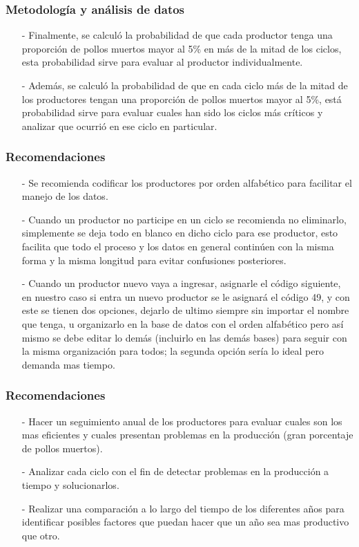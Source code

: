 \documentclass[11pt]{beamer}
\begin{document}
\begin{frame}
\frametitle{Metodología y análisis de datos}
\begin{itemize}
\item[-]Finalmente, se calculó la probabilidad de que cada productor tenga una proporción de pollos muertos mayor al 5\% en más de la mitad de los ciclos, esta probabilidad sirve para evaluar al productor individualmente.
\item[-]Además, se calculó la probabilidad de que en cada ciclo más de la mitad de los productores tengan una proporción de pollos muertos mayor al 5\%, está probabilidad sirve para evaluar cuales han sido los ciclos más críticos y analizar que ocurrió en ese ciclo en particular.
\end{itemize}
\end{frame}


\begin{frame}
\frametitle{Recomendaciones}
\begin{itemize}
\item[-]Se recomienda codificar los productores por orden alfabético para facilitar el manejo de los datos.
\item[-]Cuando un productor no participe en un ciclo se recomienda no eliminarlo, simplemente se deja todo en blanco en dicho ciclo para ese productor, esto facilita que todo el proceso y los datos en general continúen con la misma forma y la misma longitud para evitar confusiones posteriores.
\item[-]Cuando un productor nuevo vaya a ingresar, asignarle el código siguiente, en nuestro caso si entra un nuevo productor se le asignará el código 49, y con este se tienen dos opciones, dejarlo de ultimo siempre sin importar el nombre que tenga, u organizarlo en la base de datos con el orden alfabético pero así mismo se debe editar lo demás (incluirlo en las demás bases) para seguir con la misma organización para todos; la segunda opción sería lo ideal pero demanda mas tiempo.
\end{itemize}
\end{frame}

\begin{frame}
\frametitle{Recomendaciones}
\begin{itemize}
\item[-]Hacer un seguimiento anual de los productores para evaluar cuales son los mas eficientes y cuales presentan problemas en la producción (gran porcentaje de pollos muertos).
\item[-]Analizar cada ciclo con el fin de detectar problemas en la producción a tiempo y solucionarlos.
\item[-]Realizar una comparación a lo largo del tiempo de los diferentes años para identificar posibles factores que puedan hacer que un año sea mas productivo que otro.
\end{itemize}
\end{frame}
\end{document}
